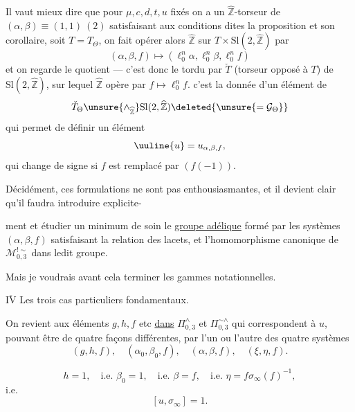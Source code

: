 Il vaut mieux dire que pour $\mu,c,d,t,u$ fixés on a un $\widehat{\mathbb Z}$-torseur de $(\alpha,\beta)\equiv(1,1)\ (2)$ satisfaisant aux conditions dites  la proposition  et son corollaire, soit $T=T_\Theta$, on fait opérer alors $\widehat{\mathbb Z}$  sur $T\times\mathrm{Sl}(2,\widehat{\mathbb Z})$ par
\[
 (\alpha,\beta,f)\longmapsto
 (\ell_0^n\alpha,\ell_0^n\beta,\ell_0^n f)
\]
et on regarde le quotient --- c'est donc le tordu par $\check T$ (torseur opposé à $T$) de $\mathrm{Sl}(2,\widehat{\mathbb Z})$, sur lequel $\widehat{\mathbb Z}$ opère par $f\longmapsto\ell_0^n f$.  c'est la donnée d'un élément  de
\[
 \check T_\Theta\unsure{\mathbin{\wedge}_{\widehat{\mathbb Z}}}\mathrm{Sl}(2,\widehat{\mathbb Z})
 \deleted{\unsure{=\mathcal G_\Theta}}
\]
qui permet de définir un élément
\[
 \uuline{u}=u_{\alpha,\beta,f},
\]
qui change de signe si $f$ est remplacé par $(f(-1))$.

Décidément, ces formulations ne sont pas enthousiasmantes, et il devient clair qu'il faudra introduire explicite-


ment et étudier  un minimum de soin le \uline{groupe adélique} formé par les systèmes $(\alpha,\beta,f)$ satisfaisant la relation des lacets, et  l'homomorphisme canonique de $\mathcal M_{0,3}^{!\sim}$ dans ledit groupe.

Mais je voudrais avant cela terminer les gammes notationnelles.



\uline{$\overline{\mathrm{IV}}$} Les trois cas particuliers fondamentaux.

On revient aux éléments $g,h,f$ etc \uline{dans} $\Pi_{0,3}^{\wedge}$ et $\Pi_{0,3}^{\sim\wedge}$ qui correspondent à $u$, pouvant être  de quatre façons différentes, par l'un ou l'autre des quatre systèmes
\[
\tag{92}
 (g,h,f),\quad(\alpha_0,\beta_0,f),\quad(\alpha,\beta,f),\quad(\xi,\eta,f).
\]

\[
\tag{93}
 h=1,\quad\text{i.e. }\beta_0=1,\quad\text{i.e. }\beta=f,\quad
 \text{i.e. }\eta=f\sigma_\infty(f)^{-1},
\]
i.e.
\[
\tag{94}
 [u,\sigma_\infty]=1.
\]

